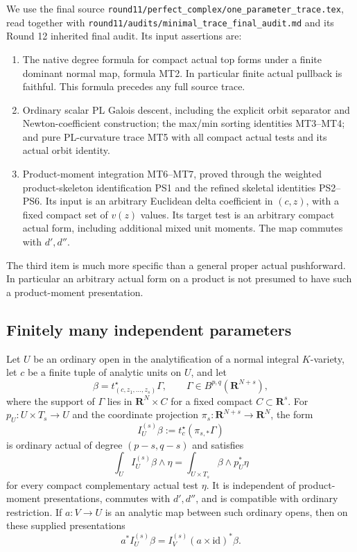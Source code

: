 We use the final source
\texttt{round11/perfect\_complex/one\_parameter\_trace.tex}, read together
with \texttt{round11/audits/minimal\_trace\_final\_audit.md} and its
Round 12 inherited final audit. Its input assertions are:
\begin{enumerate}
\item The native degree formula for compact actual top forms under a
finite dominant normal map, formula MT2. In particular finite actual
pullback is faithful. This formula precedes any full source trace.
\item Ordinary scalar PL Galois descent, including the explicit orbit
separator and Newton-coefficient construction; the max/min sorting
identities MT3--MT4; and pure PL-curvature trace MT5 with all compact
actual tests and its actual orbit identity.
\item Product-moment integration MT6--MT7, proved through the weighted
product-skeleton identification PS1 and the refined skeletal identities
PS2--PS6. Its input is an arbitrary Euclidean delta coefficient in
$(c,z)$, with a fixed compact set of $v(z)$ values. Its target test is
an arbitrary compact actual form, including additional mixed unit
moments. The map commutes with $d',d''$.
\end{enumerate}
The third item is much more specific than a general proper actual
pushforward. In particular an arbitrary actual form on a product is not
presumed to have such a product-moment presentation.

\subsection{Finitely many independent parameters}

\begin{lemma}
\label{r16ft:product}
Let $U$ be an ordinary open in the analytification of a normal integral
$K$-variety, let $c$ be a finite tuple of analytic units on $U$, and let
\[
 \beta=t_{(c,z_1,\ldots,z_s)}^\star\Gamma,
 \qquad \Gamma\in B^{p,q}(\mathbf R^{N+s}),
\]
where the support of $\Gamma$ lies in
$\mathbf R^N\times C$ for a fixed compact $C\subset\mathbf R^s$.
For $p_U:U\times T_s\to U$ and the coordinate projection
$\pi_s:\mathbf R^{N+s}\to\mathbf R^N$, the form
\[
 I^{(s)}_U\beta:=t_c^\star(\pi_{s,*}\Gamma)
 \tag{FT16.1}\label{r16ft:product-output}
\]
is ordinary actual of degree $(p-s,q-s)$ and satisfies
\[
 \int_U I^{(s)}_U\beta\wedge\eta
 =\int_{U\times T_s}\beta\wedge p_U^*\eta
 \tag{FT16.2}\label{r16ft:product-pairing}
\]
for every compact complementary actual test $\eta$. It is independent
of product-moment presentations, commutes with $d',d''$, and is
compatible with ordinary restriction. If $a:V\to U$ is an analytic
map between such ordinary opens, then on these supplied presentations
\[
 a^* I^{(s)}_U\beta
 =I^{(s)}_V (a\times\mathrm{id})^*\beta.
 \tag{FT16.3}\label{r16ft:product-base-change}
\]
\end{lemma}

